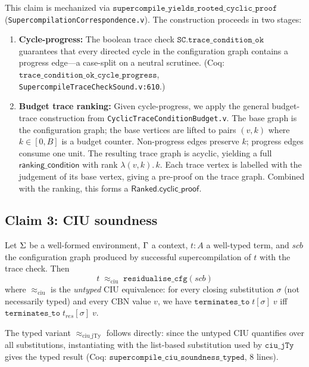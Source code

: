 This claim is mechanized via $\texttt{supercompile\_yields\_rooted\_cyclic\_proof}$ (\texttt{SupercompilationCorrespondence.v}).
The construction proceeds in two stages:

\begin{enumerate}
\item \textbf{Cycle-progress:} The boolean trace check $\texttt{SC.trace\_condition\_ok}$ guarantees that every directed cycle in the configuration graph contains a progress edge---a case-split on a neutral scrutinee. (Coq: $\texttt{trace\_condition\_ok\_cycle\_progress}$, \texttt{SupercompileTraceCheckSound.v:610}.)
\item \textbf{Budget trace ranking:} Given cycle-progress, we apply the general budget-trace construction from \texttt{CyclicTraceConditionBudget.v}. The base graph is the configuration graph; the base vertices are lifted to pairs $(v,k)$ where $k \in [0, B]$ is a budget counter. Non-progress edges preserve $k$; progress edges consume one unit. The resulting trace graph is acyclic, yielding a full $\mathsf{ranking\_condition}$ with rank $\lambda(v,k).\,k$. Each trace vertex is labelled with the judgement of its base vertex, giving a pre-proof on the trace graph. Combined with the ranking, this forms a $\mathsf{Ranked.cyclic\_proof}$.
\end{enumerate}

\subsection{Claim 3: CIU soundness}

\begin{theorem}
\label{thm:ciu}
Let $\Sigma$ be a well-formed environment, $\Gamma$ a context, $t : A$ a well-typed term, and $\mathit{scb}$ the configuration graph produced by successful supercompilation of $t$ with the trace check. Then
\[
t \;\approx_{\mathrm{ciu}}\; \mathtt{residualise\_cfg}(\mathit{scb})
\]
where $\approx_{\mathrm{ciu}}$ is the \emph{untyped} CIU equivalence: for every closing substitution $\sigma$ (not necessarily typed) and every CBN value $v$, we have $\mathtt{terminates\_to}\;t[\sigma]\;v$ iff $\mathtt{terminates\_to}\;t_{\mathit{res}}[\sigma]\;v$.

The typed variant $\approx_{\mathrm{ciu\_jTy}}$ follows directly: since the untyped CIU quantifies over all substitutions, instantiating with the list-based substitution used by $\texttt{ciu\_jTy}$ gives the typed result (Coq: $\texttt{supercompile\_ciu\_soundness\_typed}$, 8 lines).
\end{theorem}


